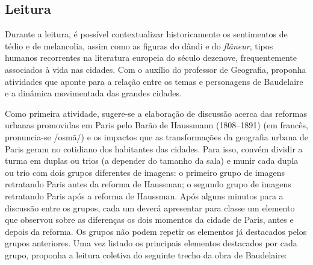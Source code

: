 \documentclass[12pt]{extarticle}
\begin{document}

\subsection{Leitura}

Durante a leitura, é possível contextualizar historicamente
os sentimentos de tédio e de melancolia, assim como as figuras do dândi
e do \textit{flâneur}, tipos humanos recorrentes na literatura europeia do
século dezenove, frequentemente associados à vida nas cidades. Com o auxílio do professor de Geografia, proponha atividades que aponte para a relação entre os temas e personagens de Baudelaire e a dinâmica movimentada das grandes cidades. 

Como primeira atividade, sugere-se a elaboração de discussão acerca das reformas urbanas promovidas em Paris pelo Barão de Haussmann (1808--1891)
(em francês, pronuncia-se /osmã/) e os impactos que as transformações da geografia urbana de Paris geram no cotidiano dos habitantes das cidades. Para isso, convém dividir a turma em duplas ou trios (a depender do tamanho da sala) e munir cada dupla ou trio com dois grupos diferentes de imagens: o primeiro grupo de imagens retratando Paris antes da reforma de Haussman; o segundo grupo de imagens retratando Paris após a reforma de Haussman. Após alguns minutos para a discussão entre os grupos, cada um deverá apresentar para classe um elemento que observou sobre as diferenças os dois momentos da cidade de Paris, antes e depois da reforma. Os grupos não podem repetir os elementos já destacados pelos grupos anteriores. Uma vez listado os principais elementos destacados por cada grupo, proponha a leitura coletiva do seguinte trecho da obra de Baudelaire:
\end{document}
